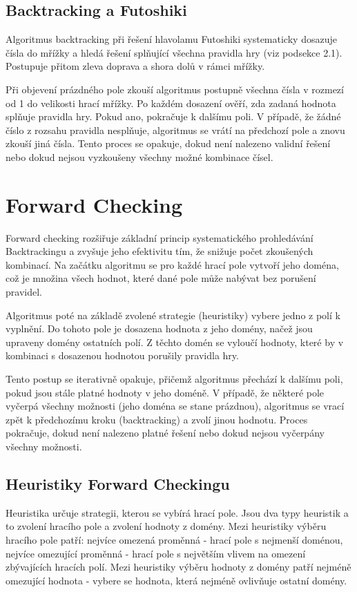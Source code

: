 \subsection{Backtracking a Futoshiki}

Algoritmus backtracking při řešení hlavolamu Futoshiki systematicky dosazuje
čísla do mřížky a hledá řešení splňující všechna pravidla hry (viz podsekce
2.1). Postupuje přitom zleva doprava a shora dolů v rámci mřížky.

Při objevení prázdného pole zkouší algoritmus postupně všechna čísla v rozmezí
od 1 do velikosti hrací mřížky. Po každém dosazení ověří, zda zadaná hodnota
splňuje pravidla hry. Pokud ano, pokračuje k dalšímu poli. V případě, že žádné
číslo z rozsahu pravidla nesplňuje, algoritmus se vrátí na předchozí pole a
znovu zkouší jiná čísla. Tento proces se opakuje, dokud není nalezeno validní
řešení nebo dokud nejsou vyzkoušeny všechny možné kombinace čísel.

\section{Forward Checking}

Forward checking \cite{PrednaskyIZU} rozšiřuje základní princip systematického
prohledávání Backtrackingu a zvyšuje jeho efektivitu tím, že snižuje počet
zkoušených kombinací. Na začátku algoritmu se pro každé hrací pole vytvoří jeho
doména, což je množina všech hodnot, které dané pole může nabývat bez porušení
pravidel.

Algoritmus poté na základě zvolené strategie (heuristiky) vybere jedno z polí k
vyplnění. Do tohoto pole je dosazena hodnota z jeho domény, načež jsou upraveny
domény ostatních polí. Z těchto domén se vyloučí hodnoty, které by v kombinaci
s dosazenou hodnotou porušily pravidla hry.

Tento postup se iterativně opakuje, přičemž algoritmus přechází k dalšímu poli,
pokud jsou stále platné hodnoty v jeho doméně. V případě, že některé pole
vyčerpá všechny možnosti (jeho doména se stane prázdnou), algoritmus se vrací
zpět k předchozímu kroku (backtracking) a zvolí jinou hodnotu. Proces
pokračuje, dokud není nalezeno platné řešení nebo dokud nejsou vyčerpány
všechny možnosti.

\subsection{Heuristiky Forward Checkingu}

Heuristika určuje strategii, kterou se vybírá hrací pole. Jsou dva typy
heuristik a to zvolení hracího pole a zvolení hodnoty z domény. Mezi heuristiky
výběru hracího pole patří: nejvíce omezená proměnná - hrací pole s nejmenší
doménou, nejvíce omezující proměnná - hrací pole s největším vlivem na omezení
zbývajících hracích polí. Mezi heuristiky výběru hodnoty z domény patří nejméně
omezující hodnota - vybere se hodnota, která nejméně ovlivňuje ostatní domény.

